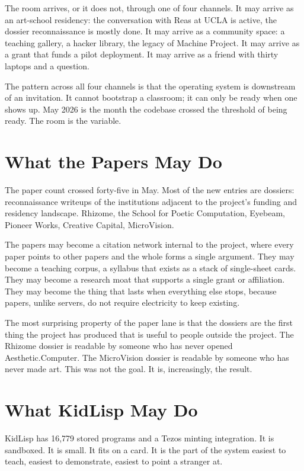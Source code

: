 \documentclass[11pt,letterpaper]{article}
\newcommand{\ac}{Aesthetic\textcolor{acpink}{.}Computer}
\begin{document}
The room arrives, or it does not, through one of four channels. It may arrive as an art-school residency: the conversation with Reas at UCLA is active, the dossier reconnaissance is mostly done. It may arrive as a community space: a teaching gallery, a hacker library, the legacy of Machine Project. It may arrive as a grant that funds a pilot deployment. It may arrive as a friend with thirty laptops and a question.

The pattern across all four channels is that the operating system is downstream of an invitation. It cannot bootstrap a classroom; it can only be ready when one shows up. May 2026 is the month the codebase crossed the threshold of being ready. The room is the variable.

\section{What the Papers May Do}

The paper count crossed forty-five in May. Most of the new entries are dossiers: reconnaissance writeups of the institutions adjacent to the project's funding and residency landscape. Rhizome, the School for Poetic Computation, Eyebeam, Pioneer Works, Creative Capital, MicroVision.

The papers may become a citation network internal to the project, where every paper points to other papers and the whole forms a single argument. They may become a teaching corpus, a syllabus that exists as a stack of single-sheet cards. They may become a research moat that supports a single grant or affiliation. They may become the thing that lasts when everything else stops, because papers, unlike servers, do not require electricity to keep existing.

The most surprising property of the paper lane is that the dossiers are the first thing the project has produced that is useful to people outside the project. The Rhizome dossier is readable by someone who has never opened \ac{}. The MicroVision dossier is readable by someone who has never made art. This was not the goal. It is, increasingly, the result.

\section{What KidLisp May Do}

KidLisp has 16,779 stored programs and a Tezos minting integration. It is sandboxed. It is small. It fits on a card. It is the part of the system easiest to teach, easiest to demonstrate, easiest to point a stranger at.
\end{document}
